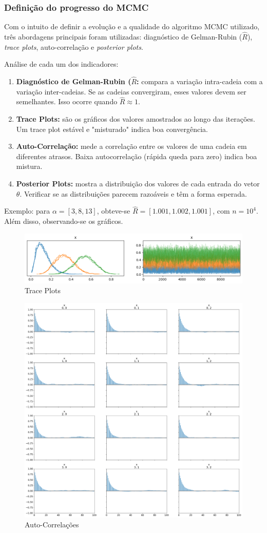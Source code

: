 \documentclass{article}
\begin{document}
\subsubsection{Definição do progresso do MCMC}
Com o intuito de definir a evolução e a qualidade do algoritmo MCMC utilizado, três abordagens principais foram utilizadas: diagnóstico de Gelman-Rubin ($\hat{R}$), \textit{trace plots}, auto-correlação e \textit{posterior plots}.

Análise de cada um dos indicadores:
\begin{enumerate}
    \item \textbf{Diagnóstico de Gelman-Rubin ($\hat{R}$:} compara a variação intra-cadeia com a variação inter-cadeias. Se as cadeias convergiram, esses valores devem ser semelhantes. Isso ocorre quando $\hat{R} \approx 1$.
    \item \textbf{Trace Plots:} são os gráficos dos valores amostrados ao longo das iterações. Um trace plot estável e "misturado" indica boa convergência.
    \item \textbf{Auto-Correlação:} mede a correlação entre os valores de uma cadeia em diferentes atrasos. Baixa autocorrelação (rápida queda para zero) indica boa mistura.
    \item \textbf{Posterior Plots:} mostra a distribuição dos valores de cada entrada do vetor $\theta$. Verificar se as distribuições parecem razoáveis e têm a forma esperada.
\end{enumerate}

Exemplo: para $\alpha = [3, 8, 13]$, obteve-se $\hat{R} = [1.001, 1.002, 1.001]$, com $n = 10^4$. Além disso, observando-se os gráficos.

\begin{figure}[h]
    \centering
    \includegraphics[width=0.5\linewidth]{Trace Plot.png}
    \caption{Trace Plots}
    \label{fig:enter-label}
\end{figure}

\begin{figure}[h]
    \centering
    \includegraphics[width=0.5\linewidth]{Auto-Correlações.png}
    \caption{Auto-Correlações}
    \label{fig:enter-label}
\end{figure}
\end{document}
